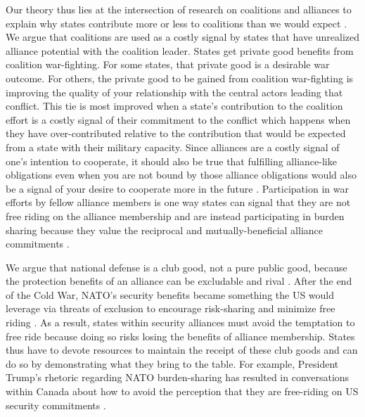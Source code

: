 \documentclass[12pt,letterpaper]{article}
\begin{document}
	Our theory thus lies at the intersection of research on coalitions and alliances to explain why states contribute more or less to coalitions than we would expect \citep{saideman_ambivalentcoalitiondoing_2016}. We argue that coalitions are used as a costly signal by states that  have unrealized alliance potential with the coalition leader. States get private good benefits from coalition war-fighting. For some states, that private good is a desirable war outcome. For others, the private good to be gained from coalition war-fighting is improving the quality of your relationship with the central actors leading that conflict. This tie is most improved when a state's contribution to the coalition effort is a costly signal of their commitment to the conflict which happens when they have over-contributed relative to the contribution that would be expected from a state with their military capacity. Since alliances are a costly signal of one's intention to cooperate, it should also be true that fulfilling alliance-like obligations even when you are not bound by those alliance obligations would also be a signal of your desire to cooperate more in the future \citep[704]{warren_geometrysecuritymodeling_2010}. Participation in war efforts by fellow alliance members is one way states can signal that they are not free riding on the alliance membership and are instead participating in burden sharing because they value the reciprocal and mutually-beneficial alliance commitments \citep[225-227]{maskaliunaite_sharingburdenassessing_2014}.

	We argue that national defense is a club good, not a pure public good, because the protection benefits of an alliance can be excludable and rival \citep[336]{sandler_clubtheorythirty_1997}. After the end of the Cold War, NATO's security benefits became something the US would leverage via threats of exclusion to encourage risk-sharing and minimize free riding \citep[324-325]{ringsmose_natoburdensharingredux_2010}. As a result, states within security alliances must avoid the temptation to free ride because doing so risks losing the benefits of alliance membership. States thus have to devote resources to maintain the receipt of these club goods and can do so by demonstrating what they bring to the table. For example, President Trump's rhetoric regarding NATO burden-sharing has resulted in conversations within Canada about how to avoid the perception that they are free-riding on US security commitments \citep[143]{mckay_whycanadabest_2018}.
	
\end{document}
